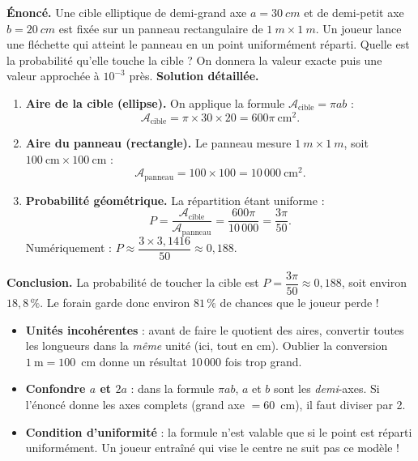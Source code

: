 \documentclass[11pt]{article}
\begin{document}
\begin{exoresolu}
\textbf{Énoncé.} Une cible elliptique de demi-grand axe $a = \SI{30}{cm}$ et de demi-petit axe $b = \SI{20}{cm}$ est fixée sur un panneau rectangulaire de $\SI{1}{m}\times\SI{1}{m}$. Un joueur lance une fléchette qui atteint le panneau en un point uniformément réparti. Quelle est la probabilité qu'elle touche la cible ? On donnera la valeur exacte puis une valeur approchée à $10^{-3}$ près.
\tcblower
\textbf{Solution détaillée.}
\begin{enumerate}
\item \textbf{Aire de la cible (ellipse).} On applique la formule $\mathcal{A}_{\text{cible}} = \pi a b$ :
\[ \mathcal{A}_{\text{cible}} = \pi \times 30 \times 20 = 600\pi~\text{cm}^2. \]
\item \textbf{Aire du panneau (rectangle).} Le panneau mesure $\SI{1}{m}\times\SI{1}{m}$, soit $100~\text{cm}\times 100~\text{cm}$ :
\[ \mathcal{A}_{\text{panneau}} = 100 \times 100 = 10\,000~\text{cm}^2. \]
\item \textbf{Probabilité géométrique.} La répartition étant uniforme :
\[ P = \dfrac{\mathcal{A}_{\text{cible}}}{\mathcal{A}_{\text{panneau}}} = \dfrac{600\pi}{10\,000} = \dfrac{3\pi}{50}. \]
Numériquement : $P \approx \dfrac{3\times 3{,}1416}{50} \approx 0{,}188$.
\end{enumerate}
\textbf{Conclusion.} La probabilité de toucher la cible est $\boxed{P = \dfrac{3\pi}{50} \approx 0{,}188}$, soit environ $18{,}8\,\%$. Le forain garde donc environ $81\,\%$ de chances que le joueur perde !
\end{exoresolu}

\begin{attention}
\begin{itemize}
\item \textbf{Unités incohérentes} : avant de faire le quotient des aires, convertir toutes les longueurs dans la \emph{même} unité (ici, tout en cm). Oublier la conversion $1~\text{m} = 100$~cm donne un résultat 10\,000 fois trop grand.
\item \textbf{Confondre $a$ et $2a$} : dans la formule $\pi a b$, $a$ et $b$ sont les \emph{demi}-axes. Si l'énoncé donne les axes complets (grand axe $=60$~cm), il faut diviser par 2.
\item \textbf{Condition d'uniformité} : la formule n'est valable que si le point est réparti uniformément. Un joueur entraîné qui vise le centre ne suit pas ce modèle !
\end{itemize}
\end{attention}
\end{document}
